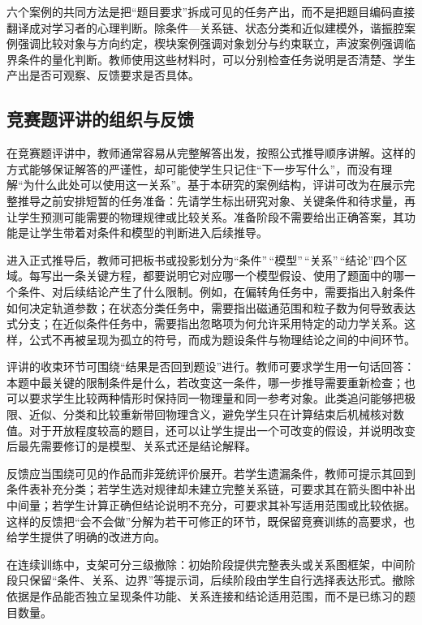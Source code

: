 \documentclass[
  12pt,
  a4paper,twoside,openany]{ctexbook}
\begin{document}
六个案例的共同方法是把``题目要求''拆成可见的任务产出，而不是把题目编码直接翻译成对学习者的心理判断。除条件---关系链、状态分类和近似建模外，谐振腔案例强调比较对象与方向约定，楔块案例强调对象划分与约束联立，声波案例强调临界条件的量化判断。教师使用这些材料时，可以分别检查任务说明是否清楚、学生产出是否可观察、反馈要求是否具体。

\subsection{竞赛题评讲的组织与反馈}\label{ux7adeux8d5bux9898ux8bc4ux8bb2ux7684ux7ec4ux7ec7ux4e0eux53cdux9988}

在竞赛题评讲中，教师通常容易从完整解答出发，按照公式推导顺序讲解。这样的方式能够保证解答的严谨性，却可能使学生只记住``下一步写什么''，而没有理解``为什么此处可以使用这一关系''。基于本研究的案例结构，评讲可改为在展示完整推导之前安排短暂的任务准备：先请学生标出研究对象、关键条件和待求量，再让学生预测可能需要的物理规律或比较关系。准备阶段不需要给出正确答案，其功能是让学生带着对条件和模型的判断进入后续推导。

进入正式推导后，教师可把板书或投影划分为``条件''\,``模型''\,``关系''\,``结论''四个区域。每写出一条关键方程，都要说明它对应哪一个模型假设、使用了题面中的哪一个条件、对后续结论产生了什么限制。例如，在偏转角任务中，需要指出入射条件如何决定轨道参数；在状态分类任务中，需要指出磁通范围和粒子数为何导致表达式分支；在近似条件任务中，需要指出忽略项为何允许采用特定的动力学关系。这样，公式不再被呈现为孤立的符号，而成为题设条件与物理结论之间的中间环节。

评讲的收束环节可围绕``结果是否回到题设''进行。教师可要求学生用一句话回答：本题中最关键的限制条件是什么，若改变这一条件，哪一步推导需要重新检查；也可以要求学生比较两种情形时保持同一物理量和同一参考对象。此类追问能够把极限、近似、分类和比较重新带回物理含义，避免学生只在计算结束后机械核对数值。对于开放程度较高的题目，还可以让学生提出一个可改变的假设，并说明改变后最先需要修订的是模型、关系式还是结论解释。

反馈应当围绕可见的作品而非笼统评价展开。若学生遗漏条件，教师可提示其回到条件表补充分类；若学生选对规律却未建立完整关系链，可要求其在箭头图中补出中间量；若学生计算正确但结论说明不充分，可要求其补写适用范围或比较依据。这样的反馈把``会不会做''分解为若干可修正的环节，既保留竞赛训练的高要求，也给学生提供了明确的改进方向。

在连续训练中，支架可分三级撤除：初始阶段提供完整表头或关系图框架，中间阶段只保留``条件、关系、边界''等提示词，后续阶段由学生自行选择表达形式。撤除依据是作品能否独立呈现条件功能、关系连接和结论适用范围，而不是已练习的题目数量。
\end{document}
